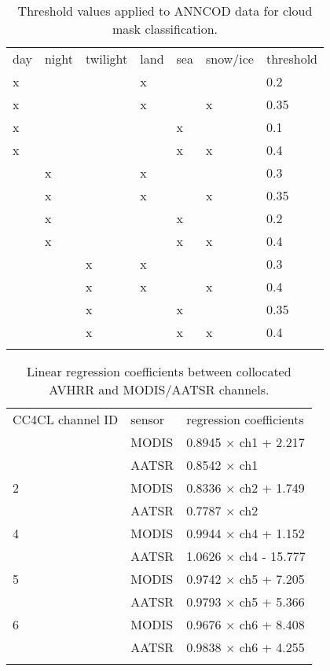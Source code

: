 \begin{table}[h]
  \caption{Threshold values applied to ANNCOD data for cloud mask classification.}
  \begin{tabular}{llllll|l} %
    \tophline
    day & night & twilight & land & sea & snow/ice & threshold \\
    \middlehline
    x   &       &          & x    &     &          & 0.2  \\
    x   &       &          & x    &     & x        & 0.35 \\
    x   &       &          &      & x   &          & 0.1  \\
    x   &       &          &      & x   & x        & 0.4  \\ \middlehline
    & x     &          & x    &     &          & 0.3  \\
    & x     &          & x    &     & x        & 0.35 \\
    & x     &          &      & x   &          & 0.2  \\
    & x     &          &      & x   & x        & 0.4  \\ \middlehline
    &       & x        & x    &     &          & 0.3  \\
    &       & x        & x    &     & x        & 0.4  \\
    &       & x        &      & x   &          & 0.35 \\
    &       & x        &      & x   & x        & 0.4  \\ \bottomhline
  \end{tabular}
  \label{tab:ANN_thresholds}
\end{table}

\clearpage

\begin{table}[h]
  \caption{Linear regression coefficients between collocated AVHRR and MODIS/AATSR channels.}
  \begin{tabular}{l|l|l} %
    \tophline
    CC4CL channel ID & sensor & regression coefficients \\
    \middlehline
    1 & MODIS & 0.8945 $\times$ ch1 + 2.217 \\
    & AATSR & 0.8542 $\times$ ch1 \\ \hline
    2 & MODIS & 0.8336 $\times$ ch2 + 1.749 \\
    & AATSR & 0.7787 $\times$ ch2 \\ \hline
    4 & MODIS & 0.9944 $\times$ ch4 + 1.152 \\
    & AATSR & 1.0626 $\times$ ch4 - 15.777 \\ \hline
    5 & MODIS & 0.9742 $\times$ ch5 + 7.205 \\
    & AATSR & 0.9793 $\times$ ch5 + 5.366 \\ \hline
    6 & MODIS & 0.9676 $\times$ ch6 + 8.408 \\
    & AATSR & 0.9838 $\times$ ch6 + 4.255 \\
    \bottomhline
  \end{tabular}
  \label{tab:ANN_coefficients}
\end{table}

